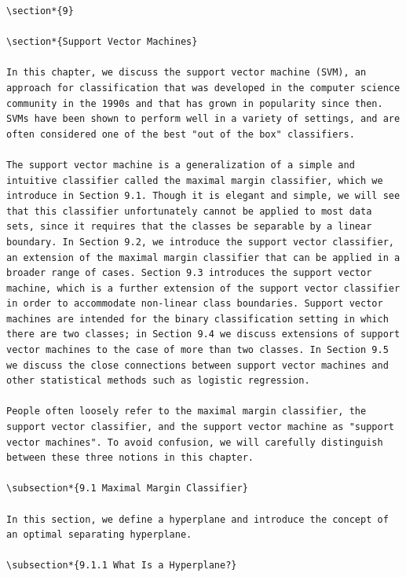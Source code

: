 \documentclass[10pt]{article}
\begin{document}
\begin{verbatim}
\section*{9}

\section*{Support Vector Machines}

In this chapter, we discuss the support vector machine (SVM), an approach for classification that was developed in the computer science community in the 1990s and that has grown in popularity since then. SVMs have been shown to perform well in a variety of settings, and are often considered one of the best "out of the box" classifiers.

The support vector machine is a generalization of a simple and intuitive classifier called the maximal margin classifier, which we introduce in Section 9.1. Though it is elegant and simple, we will see that this classifier unfortunately cannot be applied to most data sets, since it requires that the classes be separable by a linear boundary. In Section 9.2, we introduce the support vector classifier, an extension of the maximal margin classifier that can be applied in a broader range of cases. Section 9.3 introduces the support vector machine, which is a further extension of the support vector classifier in order to accommodate non-linear class boundaries. Support vector machines are intended for the binary classification setting in which there are two classes; in Section 9.4 we discuss extensions of support vector machines to the case of more than two classes. In Section 9.5 we discuss the close connections between support vector machines and other statistical methods such as logistic regression.

People often loosely refer to the maximal margin classifier, the support vector classifier, and the support vector machine as "support vector machines". To avoid confusion, we will carefully distinguish between these three notions in this chapter.

\subsection*{9.1 Maximal Margin Classifier}

In this section, we define a hyperplane and introduce the concept of an optimal separating hyperplane.

\subsection*{9.1.1 What Is a Hyperplane?}


\end{verbatim}
\end{document}
